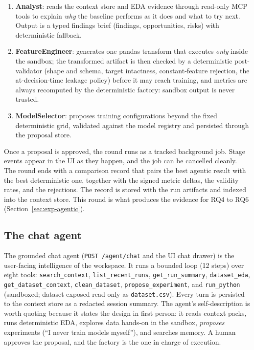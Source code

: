 \begin{enumerate}
	\item \textbf{Analyst}: reads the context store and EDA evidence through read-only MCP tools to explain \emph{why} the baseline performs as it does and what to try next. Output is a typed findings brief (findings, opportunities, risks) with deterministic fallback.
	\item \textbf{FeatureEngineer}: generates one pandas transform that executes \emph{only} inside the sandbox; the transformed artifact is then checked by a deterministic post-validator (shape and schema, target intactness, constant-feature rejection, the at-decision-time leakage policy) before it may reach training, and metrics are always recomputed by the deterministic factory: sandbox output is never trusted.
	\item \textbf{ModelSelector}: proposes training configurations beyond the fixed deterministic grid, validated against the model registry and persisted through the proposal store.
\end{enumerate}

Once a proposal is approved, the round runs as a tracked background job. Stage events appear in the UI as they happen, and the job can be cancelled cleanly. The round ends with a comparison record that pairs the best agentic result with the best deterministic one, together with the signed metric deltas, the validity rates, and the rejections. The record is stored with the run artifacts and indexed into the context store. This round is what produces the evidence for RQ4 to RQ6 (Section~\ref{sec:exp-agentic}).

\subsection{The chat agent}

The grounded chat agent (\texttt{POST /agent/chat} and the UI chat drawer) is the user-facing intelligence of the workspace. It runs a bounded loop (12 steps) over eight tools: \texttt{search\_context}, \texttt{list\_recent\_runs}, \texttt{get\_run\_summary}, \texttt{dataset\_eda}, \texttt{get\_dataset\_context}, \texttt{clean\_dataset}, \texttt{propose\_experiment}, and \texttt{run\_python} (sandboxed; dataset exposed read-only as \texttt{dataset.csv}). Every turn is persisted to the context store as a redacted session summary. The agent's self-description is worth quoting because it states the design in first person: it reads context packs, runs deterministic EDA, explores data hands-on in the sandbox, \emph{proposes} experiments (``I never train models myself''), and searches memory. A human approves the proposal, and the factory is the one in charge of execution.


